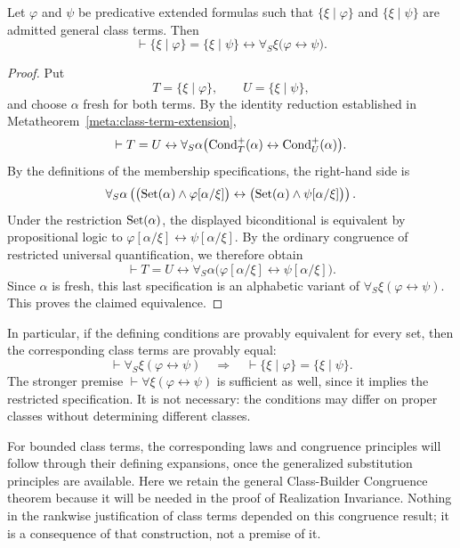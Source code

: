 \begin{metatheorem}
\label{meta:class-builder-congruence}
Let \(\varphi\) and \(\psi\) be predicative extended formulas such
that \(\{\xi\mid\varphi\}\) and \(\{\xi\mid\psi\}\) are admitted
general class terms. Then
\[
\vdash
\{\xi\mid\varphi\}
=
\{\xi\mid\psi\}
\leftrightarrow
\forall_S\xi\bigl(\varphi\leftrightarrow\psi\bigr).
\]
\end{metatheorem}

\begin{proof}
Put
\[
T=\{\xi\mid\varphi\},
\qquad
U=\{\xi\mid\psi\},
\]
and choose \(\alpha\) fresh for both terms. By the identity
reduction established in
Metatheorem~\ref{meta:class-term-extension},
\[
\vdash
T=U
\leftrightarrow
\forall_S\alpha
\bigl(\operatorname{Cond}_T^{+}(\alpha)\leftrightarrow \operatorname{Cond}_U^{+}(\alpha)\bigr).
\]
By the definitions of the membership specifications, the right-hand
side is
\[
\forall_S\alpha\left(
\bigl(\operatorname{Set}(\alpha)\land\varphi[\alpha/\xi]\bigr)
\leftrightarrow
\bigl(\operatorname{Set}(\alpha)\land\psi[\alpha/\xi]\bigr)
\right).
\]
Under the restriction \(\operatorname{Set}(\alpha)\), the displayed
biconditional is equivalent by propositional logic to
\(\varphi[\alpha/\xi]\leftrightarrow
\psi[\alpha/\xi]\). By the ordinary congruence of restricted
universal quantification, we therefore obtain
\[
\vdash
T=U
\leftrightarrow
\forall_S\alpha
\bigl(
\varphi[\alpha/\xi]
\leftrightarrow
\psi[\alpha/\xi]
\bigr).
\]
Since \(\alpha\) is fresh, this last specification is an
alphabetic variant of
\(\forall_S\xi(\varphi\leftrightarrow\psi)\).
This proves the claimed equivalence.
\end{proof}

In particular, if the defining conditions are provably equivalent
for every set, then the corresponding class terms are provably equal:
\[
\vdash\forall_S\xi(\varphi\leftrightarrow\psi)
\quad\Longrightarrow\quad
\vdash\{\xi\mid\varphi\}=\{\xi\mid\psi\}.
\]
The stronger premise
\(\vdash\forall\xi(\varphi\leftrightarrow\psi)\)
is sufficient as well, since it implies the restricted
specification. It is not necessary: the conditions may differ on
proper classes without determining different classes.

For bounded class terms, the corresponding laws and congruence
principles will follow through their defining expansions, once the
generalized substitution principles are available. Here we retain
the general Class-Builder Congruence theorem because it will be
needed in the proof of Realization Invariance. Nothing in the
rankwise justification of class terms depended on this congruence
result; it is a consequence of that construction, not a premise of it.



